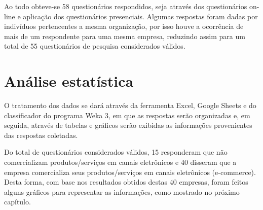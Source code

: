 Ao todo obteve-se 58 questionários respondidos, seja através dos questionários on-line e aplicação dos questionários presenciais. Algumas respostas foram dadas por indivíduos pertencentes a mesma organização, por isso houve a ocorrência de mais de um respondente para uma mesma empresa, reduzindo assim para um total de 55 questionários de pesquisa considerados válidos.


\section{Análise estatística}
\label{sec:figs}

O tratamento dos dados se dará através da ferramenta Excel, Google Sheets e do classificador do programa Weka 3, em que as respostas serão organizadas e, em seguida, através de tabelas e gráficos serão exibidas as informações provenientes das respostas coletadas. 

Do total de questionários considerados válidos, 15 responderam que não comercializam produtos/serviços em canais eletrônicos e 40 disseram que a empresa comercializa seus produtos/serviços em canais eletrônicos (e-commerce). Desta forma, com base nos resultados obtidos destas 40 empresas, foram feitos alguns gráficos para representar as informações, como mostrado no próximo capítulo.





